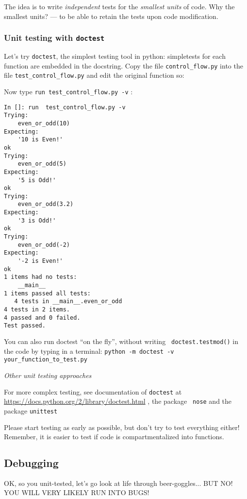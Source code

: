 The idea is to write \textit{independent} tests for the {\it smallest 
units} of code. Why the smallest units? --- to be able to retain the 
tests upon code modification. 

\subsubsection{Unit testing with {\tt doctest}}

Let's try {\tt doctest}, the simplest  testing tool in python: 
simpletests for each function are  embedded in the docstring. Copy the 
file {\tt control\_flow.py} into the file {\tt test\_control\_flow.py} 
and edit the original function so:



Now type {\tt  run test\_control\_flow.py -v} :
  
\begin{lstlisting}
In []: run  test_control_flow.py -v
Trying:
    even_or_odd(10)
Expecting:
    '10 is Even!'
ok
Trying:
    even_or_odd(5)
Expecting:
    '5 is Odd!'
ok
Trying:
    even_or_odd(3.2)
Expecting:
    '3 is Odd!'
ok
Trying:
    even_or_odd(-2)
Expecting:
    '-2 is Even!'
ok
1 items had no tests:
    __main__
1 items passed all tests:
   4 tests in __main__.even_or_odd
4 tests in 2 items.
4 passed and 0 failed.
Test passed.
    \end{lstlisting}

You can also run doctest ``on the fly'', without writing  {\tt 
doctest.testmod()} in the code by typing in a terminal: {\tt python -m 
doctest -v your\_function\_to\_test.py}

\begin{tipbox}
{\it Other unit testing approaches}
	
For more complex testing, see documentation of {\tt doctest} at 
\url{https://docs.python.org/2/library/doctest.html} , the package {\tt 
nose} and the package {\tt unittest}

Please start testing as early as possible, but don't try to test 
everything either! Remember, it is easier to test if code is 
compartmentalized into functions. 
\end{tipbox}
  
\subsection{Debugging}

OK, so you unit-tested, let's go look at life through beer-goggles... 
BUT NO! YOU WILL VERY LIKELY RUN INTO BUGS!

